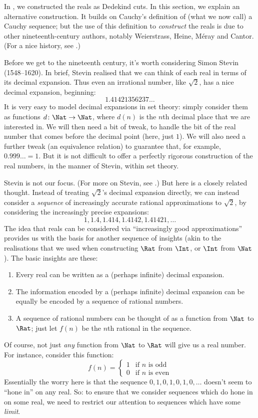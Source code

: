 \documentclass[../../../include/open-logic-section]{subfiles}
\begin{document}

In , we constructed the reals as Dedekind cuts. In
this section, we explain an alternative construction. It builds on
Cauchy's definition of (what we now call) a Cauchy sequence; but the
use of this definition to \emph{construct} the reals is due to other
nineteenth-century authors, notably Weierstrass, Heine, M\'{e}ray and
Cantor. (For a nice history, see \cite{OConnorRobertson:RN}.)

Before we get to the nineteenth century, it's worth considering Simon
Stevin (1548--1620). In brief, Stevin realised that we can think of
each real in terms of its decimal expansion. Thus even an irrational
number, like $\sqrt{2}$, has a nice decimal expansion, beginning:
\[
	1.41421356237\ldots
\] 
It is very easy to model decimal expansions in set theory: simply
consider them as functions $d \colon \Nat \to \Nat$, where $d(n)$ is
the $n$th decimal place that we are interested in. We will then need a
bit of tweak, to handle the bit of the real number that comes before
the decimal point (here, just $1$). We will also need a further tweak
(an equivalence relation) to guarantee that, for example, $0.999\ldots
= 1$. But it is not difficult to offer a perfectly rigorous
construction of the real numbers, in the manner of Stevin, within set
theory. 

Stevin is not our focus. (For more on Stevin, see
\cite{KatzKatz2012}.) But here is a closely related thought.
Instead of treating $\sqrt{2}$'s decimal expansion directly, we can
instead consider a  \emph{sequence} of increasingly accurate rational
approximations to $\sqrt{2}$, by considering the increasingly precise
expansions: 
\[
1, 1.4, 1.414, 1.4142, 1.41421,\ldots
\]
The idea that reals can be considered via ``increasingly good
approximations'' provides us with the basis for another sequence of
insights (akin to the realisations that we used when constructing
$\Rat$ from $\Int$, or $\Int$ from $\Nat$). The basic insights are
these:
\begin{enumerate}
	\item Every real can be written as a (perhaps infinite) decimal
	expansion.
	\item The information encoded by a (perhaps infinite) decimal
	expansion can be equally be encoded by a sequence of rational
	numbers.
	\item A sequence of rational numbers can be thought of as a
	function from $\Nat$ to $\Rat$; just let $f(n)$ be the $n$th
	rational in the sequence.
\end{enumerate}
Of course, not just \emph{any} function from $\Nat$ to $\Rat$ will
give us a real number. For instance, consider this function:
\[
	f(n) =\begin{cases}
			1 & \text{if }n\text{ is odd}\\
			0 &\text{if }n\text{ is even}
		\end{cases}
\]
Essentially the worry here is that the sequence $0,1,0,1,0,1,0,\ldots$
doesn't seem to ``hone in'' on any real. So: to ensure that we
consider sequences which do hone in on some real, we need to restrict
our attention to sequences which have some \emph{limit}. 
\end{document}
